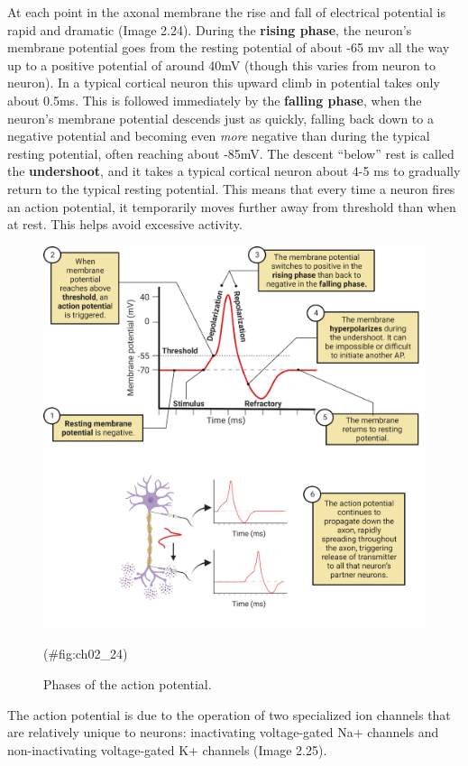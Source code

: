 \documentclass[
]{book}
\begin{document}
At each point in the axonal membrane the rise and fall of electrical potential is rapid and dramatic (Image 2.24). During the \textbf{rising phase}, the neuron's membrane potential goes from the resting potential of about -65 mv all the way up to a positive potential of around 40mV (though this varies from neuron to neuron). In a typical cortical neuron this upward climb in potential takes only about 0.5ms. This is followed immediately by the \textbf{falling phase}, when the neuron's membrane potential descends just as quickly, falling back down to a negative potential and becoming even \emph{more} negative than during the typical resting potential, often reaching about -85mV. The descent ``below'' rest is called the \textbf{undershoot}, and it takes a typical cortical neuron about 4-5 ms to gradually return to the typical resting potential. This means that every time a neuron fires an action potential, it temporarily moves further away from threshold than when at rest. This helps avoid excessive activity.

\begin{figure}

{\centering \includegraphics[width=0.8\linewidth]{images/ch02/02_24} 

}

\caption{Phases of the action potential.}(\#fig:ch02_24)
\end{figure}

The action potential is due to the operation of two specialized ion channels that are relatively unique to neurons: inactivating voltage-gated Na+ channels and non-inactivating voltage-gated K+ channels (Image 2.25).
\end{document}
